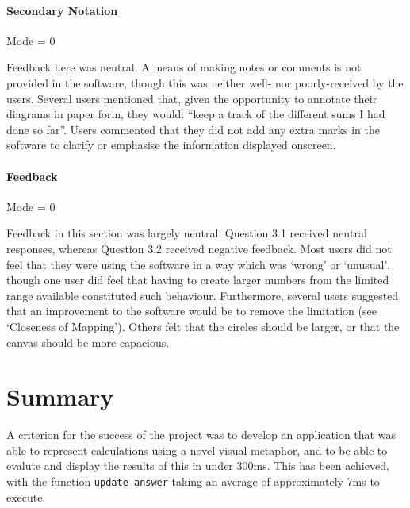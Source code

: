 \documentclass[12pt,twoside,notitlepage,xetex]{report}
\begin{document}
\paragraph{Secondary Notation}\hfill

Mode = 0

Feedback here was neutral.  A means of making notes or comments is not provided in the software, though this was neither well- nor poorly-received by the users.  Several users mentioned that, given the opportunity to annotate their diagrams in paper form, they would: ``keep a track of the different sums I had done so far''.  Users commented that they did not add any extra marks in the software to clarify or emphasise the information displayed onscreen.

\paragraph{Feedback}\hfill

Mode = 0

Feedback in this section was largely neutral.  Question 3.1 received neutral responses, whereas Question 3.2 received negative feedback.  Most users did not feel that they were using the software in a way which was `wrong' or `unusual', though one user did feel that having to create larger numbers from the limited range available constituted such behaviour.  Furthermore, several users suggested that an improvement to the software would be to remove the limitation (see `Closeness of Mapping').  Others felt that the circles should be larger, or that the canvas should be more capacious.

\section{Summary}
A criterion for the success of the project was to develop an application that was able to represent calculations using a novel visual metaphor, and to be able to evalute and display the results of this in under 300ms.  This has been achieved, with the function \verb¬update-answer¬ taking an average of approximately 7ms to execute.
\end{document}
